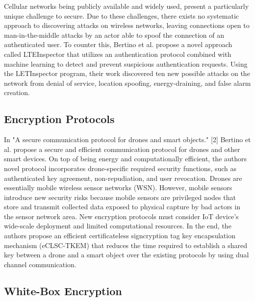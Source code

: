 \documentclass[journal,onecolumn]{IEEEtran}
\begin{document}
Cellular networks being publicly available and widely used, present a particularly unique challenge to secure. Due to these challenges, there exists no systematic approach to discovering attacks on wireless networks, leaving connections open to man-in-the-middle attacks by an actor able to spoof the connection of an authenticated user. To counter this, Bertino et al. propose a novel approach called LTEInspector that utilizes an authentication protocol combined with machine learning to detect and prevent suspicious authentication requests. Using the LETInspector program, their work discovered ten new possible attacks on the network from denial of service, location spoofing, energy-draining, and false alarm creation. 

\subsection{Encryption Protocols}

In "A secure communication protocol for drones and smart objects." [2] Bertino et al. propose a secure and efficient communication protocol for drones and other smart devices. On top of being energy and computationally efficient, the authors novel protocol incorporates drone-specific required security functions, such as authenticated key agreement, non-repudiation, and user revocation. Drones are essentially mobile wireless sensor networks (WSN). However, mobile sensors introduce new security risks because mobile sensors are privileged nodes that store and transmit collected data exposed to physical capture by bad actors in the sensor network area. New encryption protocols must consider IoT device's wide-scale deployment and limited computational resources. In the end, the authors propose an efficient certificateless signcryption tag key encapsulation mechanism (eCLSC-TKEM) that reduces the time required to establish a shared key between a drone and a smart object over the existing protocols by using dual channel communication. 

\subsection{White-Box Encryption}
\end{document}
